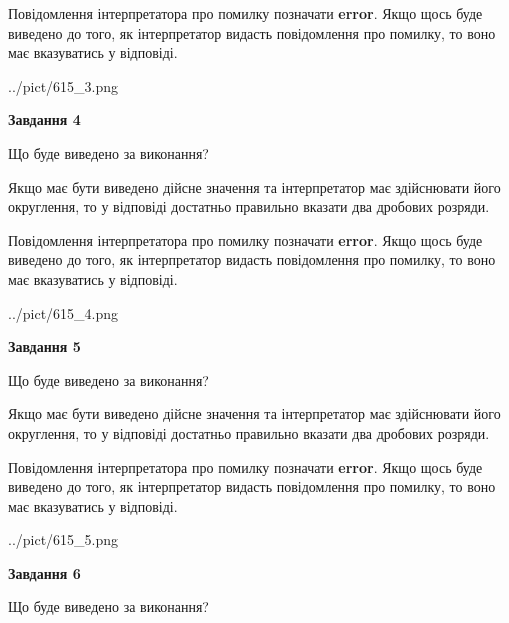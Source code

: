 \documentclass[12pt, ukrainian]{article}
\begin{document}
{\begin {Large}
Повідомлення інтерпретатора про помилку позначати \textbf{error}.
Якщо щось буде виведено до того, як інтерпретатор видасть повідомлення про помилку, 
то воно має вказуватись у відповіді. \par

\begin{center}
	{../pict/615_3.png}
\end{center}
\newpage

{\begin {center}\textbf{Завдання 4}\end {center}}\par
Що буде виведено за виконання? \par

Якщо має бути виведено дійсне значення та інтерпретатор має здійснювати його округлення, 
то у відповіді достатньо правильно вказати два дробових розряди.

Повідомлення інтерпретатора про помилку позначати \textbf{error}.
Якщо щось буде виведено до того, як інтерпретатор видасть повідомлення про помилку, 
то воно має вказуватись у відповіді. \par

\begin{center}
	{../pict/615_4.png}
\end{center}
\newpage

{\begin {center}\textbf{Завдання 5}\end {center}}\par
Що буде виведено за виконання? \par

Якщо має бути виведено дійсне значення та інтерпретатор має здійснювати його округлення, 
то у відповіді достатньо правильно вказати два дробових розряди.

Повідомлення інтерпретатора про помилку позначати \textbf{error}.
Якщо щось буде виведено до того, як інтерпретатор видасть повідомлення про помилку, 
то воно має вказуватись у відповіді. \par

\begin{center}
	{../pict/615_5.png}
\end{center}
\newpage

{\begin {center}\textbf{Завдання 6}\end {center}}\par
Що буде виведено за виконання? \par


\end{Large}}
\end{document}
